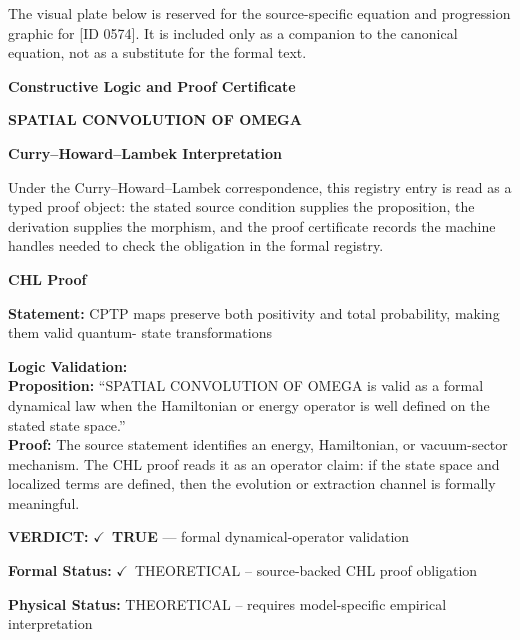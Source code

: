 \begingroup\footnotesize\sloppy
The visual plate below is reserved for the source-specific equation and progression graphic for [ID 0574]. It is included only as a companion to the canonical equation, not as a substitute for the formal text.
\par\endgroup
\ifTZPDarkEdition
{}
\fi

\clearpage
\begingroup\tzpsupportsetup
\noindent\textbf{\fontsize{10.8pt}{12.8pt}\selectfont [ID 0574] Constructive Logic and Proof Certificate}\par
\noindent\textbf{\fontsize{10pt}{12pt}\selectfont SPATIAL CONVOLUTION OF OMEGA}\par
\vspace{0.45em}
\begingroup
\footnotesize
\setlength{\parskip}{0.22em}
\setlength{\parindent}{0pt}
\noindent\textbf{Curry--Howard--Lambek Interpretation}\par
Under the Curry--Howard--Lambek correspondence, this registry entry is read as a typed proof
object: the stated source condition supplies the proposition, the derivation supplies the
morphism, and the proof certificate records the machine handles needed to check the obligation
in the formal registry.

\vspace{0.45em}
\noindent\textbf{CHL Proof}\par
\textbf{Statement:} CPTP maps preserve both positivity and total probability, making them valid quantum-
state transformations

\textbf{Logic Validation:}\\
\textbf{Proposition:} ``SPATIAL CONVOLUTION OF OMEGA is valid as a formal dynamical law when the Hamiltonian or
energy operator is well defined on the stated state space.''\\
\textbf{Proof:} The source statement identifies an energy, Hamiltonian, or vacuum-sector mechanism. The
CHL proof reads it as an operator claim: if the state space and localized terms are
defined, then the evolution or extraction channel is formally meaningful.

\textbf{VERDICT:} \ensuremath{\checkmark}\ \textbf{TRUE} --- formal dynamical-operator validation

\textbf{Formal Status:} \ensuremath{\checkmark}\ THEORETICAL -- source-backed CHL proof obligation

\textbf{Physical Status:} THEORETICAL -- requires model-specific empirical interpretation
\par\vspace{0.45em}
\par
\ifTZPDarkEdition
{}
\fi
\endgroup
\endgroup

